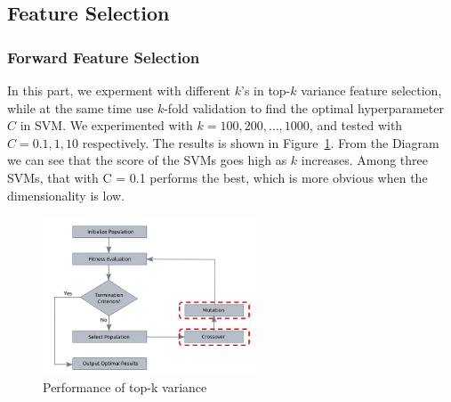 \documentclass[journal]{IEEEtran}
\begin{document}
\subsection{Feature Selection}
\subsubsection{Forward Feature Selection}
In this part, we experment with different $k$'s in top-$k$ variance feature selection, while at the same time use $k$-fold validation to find the optimal hyperparameter $C$ in SVM. We experimented with $k=100, 200, \ldots, 1000$, and tested with $C = 0.1, 1, 10$ respectively. The results is shown in Figure~\ref{fig:2}. From the Diagram we can see that the score of the SVMs goes high as $k$ increases. Among three SVMs, that with C = 0.1 performs the best, which is more obvious when the dimensionality is low.
\begin{figure}[htpb]
  \centering
  \includegraphics[width=2.5in]{genetic_alg.jpg}
  \caption{Performance of top-k variance}
  \label{fig:2}
  \vspace{-3mm}
\end{figure}
\end{document}
